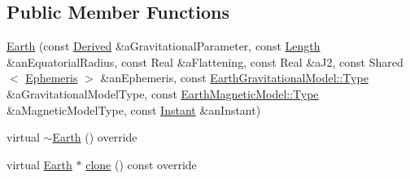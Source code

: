 \subsection*{Public Member Functions}
\begin{DoxyCompactItemize}
\item 
\hyperlink{classostk_1_1physics_1_1env_1_1obj_1_1celest_1_1_earth_aeed4d52f7da5b8f895701eb79826599a}{Earth} (const \hyperlink{classostk_1_1physics_1_1units_1_1_derived}{Derived} \&a\+Gravitational\+Parameter, const \hyperlink{classostk_1_1physics_1_1units_1_1_length}{Length} \&an\+Equatorial\+Radius, const Real \&a\+Flattening, const Real \&a\+J2, const Shared$<$ \hyperlink{classostk_1_1physics_1_1env_1_1_ephemeris}{Ephemeris} $>$ \&an\+Ephemeris, const \hyperlink{classostk_1_1physics_1_1environment_1_1gravitational_1_1_earth_a9895df78b5c5aab5e981bf765f8c0f05}{Earth\+Gravitational\+Model\+::\+Type} \&a\+Gravitational\+Model\+Type, const \hyperlink{classostk_1_1physics_1_1environment_1_1magnetic_1_1_earth_a30a064d87b6fce338e76aebd3043b6b6}{Earth\+Magnetic\+Model\+::\+Type} \&a\+Magnetic\+Model\+Type, const \hyperlink{classostk_1_1physics_1_1time_1_1_instant}{Instant} \&an\+Instant)
\item 
virtual \hyperlink{classostk_1_1physics_1_1env_1_1obj_1_1celest_1_1_earth_ac718f964c68fa41331978751a9ca4818}{$\sim$\+Earth} () override
\item 
virtual \hyperlink{classostk_1_1physics_1_1env_1_1obj_1_1celest_1_1_earth}{Earth} $\ast$ \hyperlink{classostk_1_1physics_1_1env_1_1obj_1_1celest_1_1_earth_ae86664b9d6fc870baa1dac5c3219f784}{clone} () const override
\end{DoxyCompactItemize}
